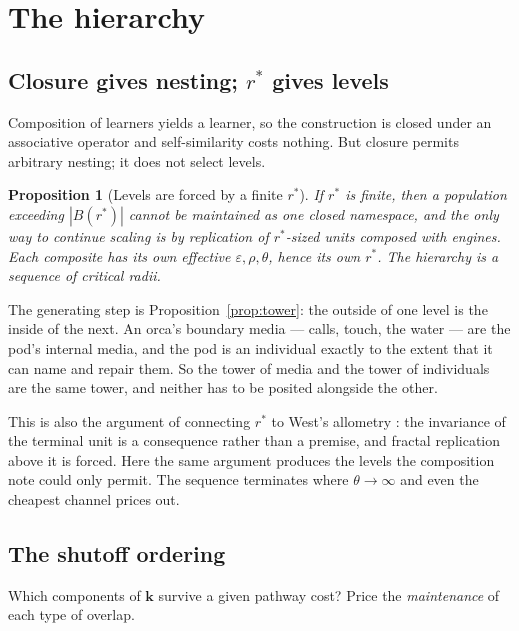 \documentclass[11pt]{article}
\theoremstyle{plain}
\newtheorem{proposition}[theorem]{Proposition}
\theoremstyle{definition}
\theoremstyle{remark}
\begin{document}
\section{The hierarchy}
\label{sec:hier}

\subsection{Closure gives nesting; $r^\ast$ gives levels}

Composition of learners yields a learner, so the construction is closed
under an associative operator and self-similarity costs nothing. But
closure permits arbitrary nesting; it does not select levels.

\begin{proposition}[Levels are forced by a finite $r^\ast$]
If $r^\ast$ is finite, then a population exceeding $|B(r^\ast)|$ cannot be
maintained as one closed namespace, and the only way to continue scaling is
by replication of $r^\ast$-sized units composed with engines. Each
composite has its own effective $\varepsilon, \rho, \theta$, hence its own
$r^\ast$. The hierarchy is a sequence of critical radii.
\end{proposition}

The generating step is Proposition~\ref{prop:tower}: the outside of one
level is the inside of the next. An orca's boundary media --- calls, touch,
the water --- are the pod's internal media, and the pod is an individual
exactly to the extent that it can name and repair them. So the tower of
media and the tower of individuals are the same tower, and neither has to
be posited alongside the other.

This is also the argument of \cite[\S6]{compaut} connecting $r^\ast$ to
West's allometry \cite{west}: the invariance of the terminal unit is a consequence
rather than a premise, and fractal replication above it is forced. Here the
same argument produces the levels the composition note could only permit.
The sequence terminates where $\theta \to \infty$ and even the cheapest
channel prices out.

\subsection{The shutoff ordering}

Which components of $\mathbf{k}$ survive a given pathway cost? Price the
\emph{maintenance} of each type of overlap.
\end{document}
